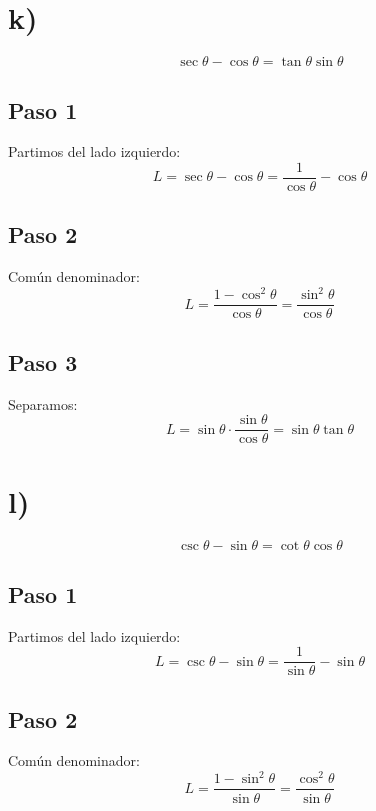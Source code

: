 \documentclass[12pt,a4paper]{article}
\begin{document}
\newpage
\section*{k)}

\begin{identidad}
\[
\sec\theta-\cos\theta=\tan\theta\sin\theta
\]
\end{identidad}

\subsection*{Paso 1}
Partimos del lado izquierdo:
\[
L = \sec\theta - \cos\theta = \frac1{\cos\theta} - \cos\theta
\]

\subsection*{Paso 2}
Común denominador:
\[
L = \frac{1-\cos^2\theta}{\cos\theta} = \frac{\sin^2\theta}{\cos\theta}
\]

\subsection*{Paso 3}
Separamos:
\[
L = \sin\theta \cdot \frac{\sin\theta}{\cos\theta} = \sin\theta\tan\theta
\]

\newpage
\section*{l)}

\begin{identidad}
\[
\csc\theta-\sin\theta=\cot\theta\cos\theta
\]
\end{identidad}

\subsection*{Paso 1}
Partimos del lado izquierdo:
\[
L = \csc\theta - \sin\theta = \frac1{\sin\theta} - \sin\theta
\]

\subsection*{Paso 2}
Común denominador:
\[
L = \frac{1-\sin^2\theta}{\sin\theta} = \frac{\cos^2\theta}{\sin\theta}
\]
\end{document}
